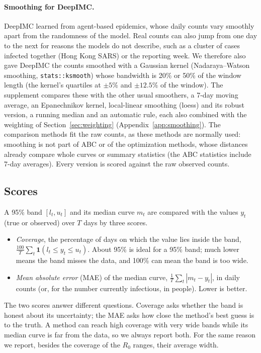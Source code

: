 \documentclass[12pt]{article}
\begin{document}
\paragraph{Smoothing for DeepIMC.} DeepIMC learned from agent-based epidemics, whose daily counts vary
smoothly apart from the randomness of the model. Real counts can also jump from one day to the next for
reasons the models do not describe, such as a cluster of cases infected together (Hong Kong SARS) or the
reporting week. We therefore also gave DeepIMC the counts smoothed with a Gaussian kernel (Nadaraya--Watson
smoothing, \texttt{stats::ksmooth}) whose bandwidth is 20\% or 50\% of the window length (the kernel's
quartiles at $\pm 5\%$ and $\pm 12.5\%$ of the window). The supplement compares these with the other usual smoothers, a 7-day
moving average, an Epanechnikov kernel, local-linear smoothing (loess) and its robust version, a running median
and an automatic rule, each also combined with the weighting of Section~\ref{sec:weighting}
(Appendix~\ref{app:smoothing}). The comparison methods fit the raw counts, as these
methods are normally used: smoothing is not part of ABC or of the optimization methods, whose distances
already compare whole curves or summary statistics (the ABC statistics include 7-day averages). Every
version is scored against the raw observed counts.

\subsection{Scores}\label{sec:scores}

A 95\% band $[l_t, u_t]$ and its median curve $m_t$ are compared with the values $y_t$ (true or
observed) over $T$ days by three scores.
\begin{itemize}[leftmargin=*]
\item \emph{Coverage}, the percentage of days on which the value lies inside the band,
$\frac{100}{T}\sum_t \mathbf{1}(l_t\le y_t\le u_t)$. About 95\% is ideal for a 95\% band; much lower
means the band misses the data, and 100\% can mean the band is too wide.
\item \emph{Mean absolute error} (MAE) of the median curve, $\frac1T\sum_t |m_t-y_t|$, in daily counts
(or, for the number currently infectious, in people). Lower is better.
\end{itemize}
The two scores answer different questions. Coverage asks whether the band is honest about its
uncertainty; the MAE asks how close the method's best guess is to the truth. A method can reach high
coverage with very wide bands while its median curve is far from the data, so we always report both.
For the same reason we report, besides the coverage of the $R_0$ ranges, their average width.
\end{document}
